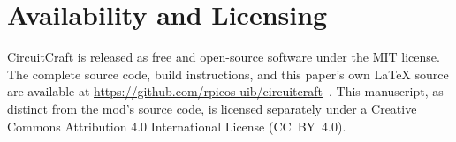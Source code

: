 \section*{Availability and Licensing}

CircuitCraft is released as free and open-source software under the MIT license. The
complete source code, build instructions, and this paper's own \LaTeX{} source are available
at \url{https://github.com/rpicos-uib/circuitcraft}~\cite{picos2026circuitcraft}. This
manuscript, as distinct from the mod's source code, is licensed separately under a Creative
Commons Attribution 4.0 International License (CC~BY~4.0).
